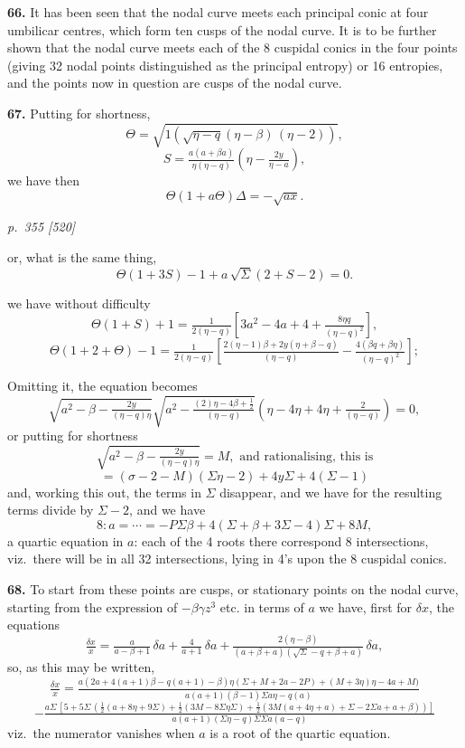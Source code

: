 \documentclass[11pt,a4paper]{book}
\begin{document}
\textbf{66.} It has been seen that the nodal curve meets each principal conic at four umbilicar centres, which form ten cusps of the nodal curve. It is to be further shown that the nodal curve meets each of the 8 cuspidal conics in the four points (giving 32 nodal points distinguished as the principal entropy) or 16 entropies, and the points now in question are cusps of the nodal curve.

\textbf{67.} Putting for shortness,
\[
\Theta = \sqrt{1\!\left(\!\sqrt{\eta - q}(\eta - \beta)\,(\eta - 2)\right)},
\]
\[
S = \tfrac{a(a + \beta a)}{\eta(\eta - q)}\!\left(\eta - \tfrac{2y}{\eta - a}\right),
\]
we have then
\[
\Theta(1 + a\Theta)\Delta = -\sqrt{a x}.
\]

\clearpage

\bigskip
\textit{p.~355 [520]}
\smallskip

or, what is the same thing,
\[
\Theta(1 + 3S) - 1 + a\,\sqrt{\Sigma}(2 + S - 2) = 0.
\]

we have without difficulty
\[
\Theta(1 + S) + 1 = \tfrac{1}{2(\eta - q)}[3a^2 - 4a + 4 + \tfrac{8\eta q}{(\eta - q)^2}],
\]
\[
\Theta(1 + 2 + \Theta) - 1 = \tfrac{1}{2(\eta - q)}\!\left[\tfrac{2(\eta - 1)\beta + 2y(\eta + \beta - q)}{(\eta - q)} - \tfrac{4(\beta q + \beta\eta)}{(\eta - q)^2}\right];
\]

Omitting it, the equation becomes
\[
\sqrt{a^2 - \beta - \tfrac{2y}{(\eta - q)\eta}}\sqrt{a^2 - \tfrac{(2)\eta - 4\beta + \tfrac{1}{2}}{(\eta - q)}}\!\left(\eta - 4\eta + 4\eta + \tfrac{2}{(\eta - q)}\right) = 0,
\]
or putting for shortness
\[
\sqrt{a^2 - \beta - \tfrac{2y}{(\eta - q)\eta}} = M,\text{ and rationalising, this is}
\]
\[
= (\sigma - 2 - M)(\Sigma\eta - 2) + 4y\Sigma + 4(\Sigma - 1)
\]
and, working this out, the terms in $\Sigma$ disappear, and we have for the resulting terms divide by $\Sigma - 2$, and we have
\[
8 : a = \cdots = -P\Sigma\beta + 4(\Sigma + \beta + 3\Sigma - 4)\Sigma + 8M,
\]
a quartic equation in $a$: each of the 4 roots there correspond 8 intersections, viz.\ there will be in all 32 intersections, lying in 4's upon the 8 cuspidal conics.

\textbf{68.} To start from these points are cusps, or stationary points on the nodal curve, starting from the expression of $-\beta\gamma z^3$ etc. in terms of $a$ we have, first for $\delta x$, the equations
\[
\tfrac{\delta x}{x} = \tfrac{a}{a - \beta + 1}\,\delta a + \tfrac{4}{a + 1}\,\delta a + \tfrac{2(\eta - \beta)}{(a + \beta + a)(\sqrt{\Sigma} - q + \beta + a)}\,\delta a,
\]
so, as this may be written,
\[
\tfrac{\delta x}{x} = \tfrac{a(2a + 4(a + 1)\beta - q(a + 1) - \beta)\eta(\Sigma + M + 2a - 2P) + (M + 3\eta)\eta - 4a + M)}{a(a + 1)(\beta - 1)\Sigma a\eta - q(a)}
\]
\[
- \tfrac{a\Sigma\,[5 + 5\Sigma\,(\tfrac{1}{2}(a + 8\eta + 9\Sigma) + \tfrac{1}{2}(3M - 8\Sigma\eta\Sigma) + \tfrac{1}{2}(3M(a + 4\eta + a) + \Sigma - 2\Sigma a + a + \beta))]}{a(a + 1)(\Sigma\eta - q)\Sigma\Sigma a(a - q)}
\]
viz.\ the numerator vanishes when $a$ is a root of the quartic equation.
\end{document}

